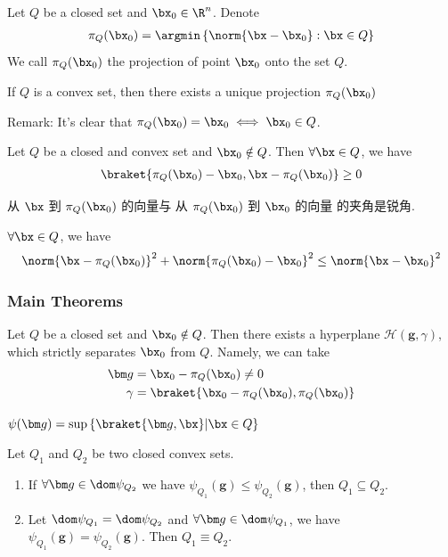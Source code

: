 \begin{definition}[Projection]
    Let $Q$ be a closed set and $\bx_0\in\R^n$. Denote 
    \begin{align*}
        \pi_Q(\bx_0)=\argmin\left\{ \norm{\bx-\bx_0}:\bx \in Q \right\}
    \end{align*}
    We call $\pi_Q(\bx_0)$ the projection of point $\bx_0$ onto the set $Q$. 
\end{definition}

\begin{theorem}
    If $Q$ is a convex set, then there exists a unique projection $\pi_Q(\bx_0)$
\end{theorem}
Remark: It's clear that $\pi_Q(\bx_0)=\bx_0 \iff \bx_0\in Q$. 

\begin{lemma}
    Let $Q$ be a closed and convex set and $\bx_0\notin Q$. Then $\forall \bx\in Q$, we have
    \begin{align*}
        \braket{\pi_Q(\bx_0)-\bx_0, \bx-\pi_Q(\bx_0)}\ge 0
    \end{align*}
\end{lemma}
从 $\bx$ 到 $\pi_Q(\bx_0)$ 的向量与 从 $\pi_Q(\bx_0)$ 到 $\bx_0$ 的向量 的夹角是锐角. 
\begin{lemma}
    $\forall \bx\in Q$, we have
    \begin{align*}
        \norm{\bx-\pi_Q(\bx_0)}^2+\norm{\pi_Q(\bx_0)-\bx_0}^2\le \norm{\bx-\bx_0}^2
    \end{align*}
\end{lemma}

\subsubsection{Main Theorems}
\begin{theorem}
    Let $Q$ be a closed set and $\bx_0\notin Q$. Then there exists a hyperplane $\mathcal{H}(\bm g, \gamma)$, which strictly separates $\bx_0$ from $Q$. Namely, we can take
    \begin{align*}
        \bm g&=\bx_0-\pi_Q(\bx_0)\ne 0\\
        \gamma&=\braket{\bx_0-\pi_Q(\bx_0), \pi_Q(\bx_0)}
    \end{align*}
\end{theorem}

$\psi(\bm g)=\sup\left\{ \braket{\bm g, \bx}|\bx \in Q \right\}$

\begin{corollary}
    Let $Q_1$ and $Q_2$ be two closed convex sets.
    \begin{enumerate}
        \item If $\forall \bm g\in \dom \psi_{Q_2}$ we have $\psi_{Q_1}(\bm g)\le \psi_{Q_2}(\bm g)$, then $Q_1\subseteq Q_2$. 
        \item Let $\dom \psi_{Q_1}=\dom \psi_{Q_2}$ and $\forall \bm g\in \dom \psi_{Q_1}$, we have $\psi_{Q_1}(\bm g)=\psi_{Q_2}(\bm g)$. Then $Q_1\equiv Q_2$. 
    \end{enumerate}
\end{corollary}

